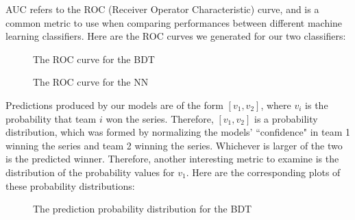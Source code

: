\documentclass[letterpaper]{article} %
\begin{document}
AUC refers to the ROC (Receiver Operator Characteristic) curve, and is a common metric to use when comparing performances between different machine learning classifiers. Here are the ROC curves we generated for our two classifiers:
\begin{figure}[H]
        \caption{\label{fig:bdt_roc} The ROC curve for the BDT}
\end{figure}
\begin{figure}[!htb]
        \caption{\label{fig:bdt_roc} The ROC curve for the NN}
\end{figure}
Predictions produced by our models are of the form $[v_1,v_2]$, where $v_i$ is the probability that team $i$ won the series. Therefore, $[v_1,v_2]$ is a probability distribution, which was formed by normalizing the models' ``confidence" in team 1 winning the series and team 2 winning the series. Whichever is larger of the two is the predicted winner. Therefore, another interesting metric to examine is the distribution of the probability values for $v_1$. Here are the corresponding plots of these probability distributions:
\begin{figure}[H]
        \caption{\label{fig:bdt_prediction_distribution} The prediction probability distribution for the BDT}
\end{figure}
\end{document}

